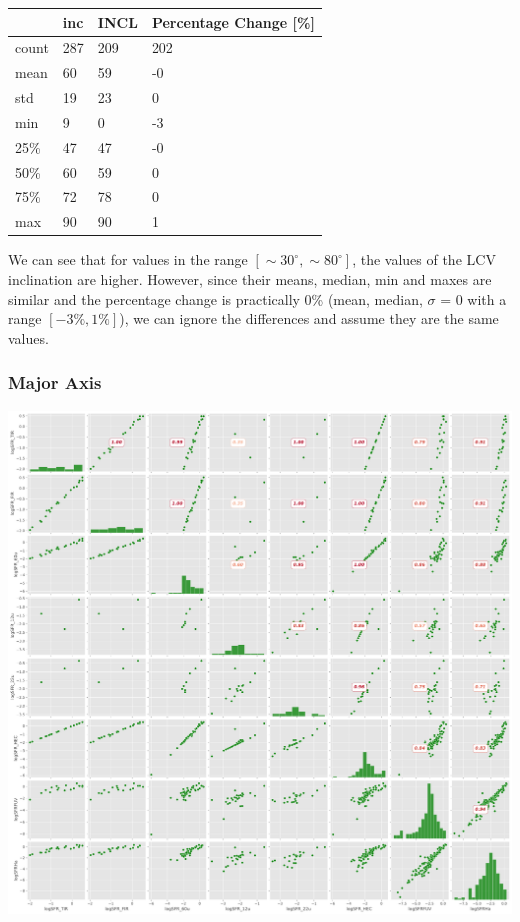 \documentclass[
]{article}
\begin{document}
\begin{longtable}[]{@{}llll@{}}
\toprule\noalign{}
& inc & INCL & Percentage Change {[}\%{]} \\
\midrule\noalign{}
\endhead
\bottomrule\noalign{}
\endlastfoot
count & 287 & 209 & 202 \\
mean & 60 & 59 & -0 \\
std & 19 & 23 & 0 \\
min & 9 & 0 & -3 \\
25\% & 47 & 47 & -0 \\
50\% & 60 & 59 & 0 \\
75\% & 72 & 78 & 0 \\
max & 90 & 90 & 1 \\
\end{longtable}

We can see that for values in the range
\([\sim 30^\circ,\sim 80^\circ]\), the values of the LCV inclination are
higher. However, since their means, median, min and maxes are similar
and the percentage change is practically 0\% (mean, median, \(\sigma\) =
0 with a range \([-3\%,1\%]\)), we can ignore the differences and assume
they are the same values.

\subsubsection{Major Axis}

\includegraphics{compare_files/figure-pdf/cell-29-output-1.pdf}
\end{document}
